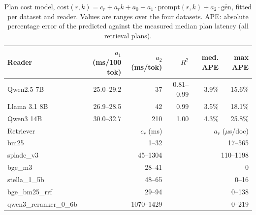 \begin{table}[t]
\centering
\caption{Plan cost model, $\mathrm{cost}(r,k) = c_r + a_r k + a_0 + a_1 \cdot \mathrm{prompt}(r,k) + a_2 \cdot \overline{\mathrm{gen}}$, fitted per dataset and reader. Values are ranges over the four datasets. APE: absolute percentage error of the predicted against the measured median plan latency (all retrieval plans).}
\label{tab:cost}
\scriptsize
\setlength{\tabcolsep}{3pt}
\begin{tabular}{lrrrrr}
\toprule
Reader & $a_1$ (ms/100 tok) & $a_2$ (ms/tok) & $R^2$ & med. APE & max APE \\
\midrule
Qwen2.5 7B & 25.0--29.2 & 37 & 0.81--0.99 & 3.9\% & 15.6\% \\
Llama 3.1 8B & 26.9--28.5 & 42 & 0.99 & 3.5\% & 18.1\% \\
Qwen3 14B & 30.0--32.7 & 210 & 1.00 & 4.3\% & 25.8\% \\
\midrule
Retriever & \multicolumn{2}{r}{$c_r$ (ms)} & \multicolumn{3}{r}{$a_r$ ($\mu$s/doc)} \\
\midrule
bm25 & \multicolumn{2}{r}{1--32} & \multicolumn{3}{r}{17--565} \\
splade\_v3 & \multicolumn{2}{r}{45--1304} & \multicolumn{3}{r}{110--1198} \\
bge\_m3 & \multicolumn{2}{r}{28--41} & \multicolumn{3}{r}{0} \\
stella\_1\_5b & \multicolumn{2}{r}{48--65} & \multicolumn{3}{r}{0--16} \\
bge\_bm25\_rrf & \multicolumn{2}{r}{29--94} & \multicolumn{3}{r}{0--138} \\
qwen3\_reranker\_0\_6b & \multicolumn{2}{r}{1070--1429} & \multicolumn{3}{r}{0--219} \\
\bottomrule
\end{tabular}
\end{table}